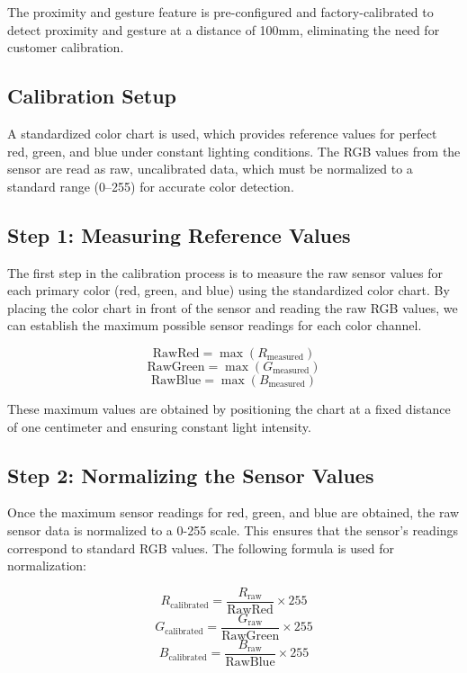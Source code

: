 \medskip

The proximity and gesture feature is pre-configured and factory-calibrated to detect proximity and gesture at a distance of 100mm, eliminating the need for customer calibration.
\cite{BroadcomAPDS9960:2024}

\subsection{Calibration Setup}

A standardized color chart is used, which provides reference values for perfect red, green, and blue under constant lighting conditions. The RGB values from the sensor are read as raw, uncalibrated data, which must be normalized to a standard range (0–255) for accurate color detection.

\subsection{Step 1: Measuring Reference Values}

The first step in the calibration process is to measure the raw sensor values for each primary color (red, green, and blue) using the standardized color chart. By placing the color chart in front of the sensor and reading the raw RGB values, we can establish the maximum possible sensor readings for each color channel.

\[
\text{RawRed} = \max(R_{\text{measured}})
\]
\[
\text{RawGreen} = \max(G_{\text{measured}})
\]
\[
\text{RawBlue} = \max(B_{\text{measured}})
\]

These maximum values are obtained by positioning the chart at a fixed distance of one centimeter and ensuring constant light intensity.

\subsection{Step 2: Normalizing the Sensor Values}
Once the maximum sensor readings for red, green, and blue are obtained, the raw sensor data is normalized to a 0-255 scale. This ensures that the sensor's readings correspond to standard RGB values. The following formula is used for normalization:

\[
R_{\text{calibrated}} = \frac{R_{\text{raw}}}{\text{RawRed}} \times 255
\]
\[
G_{\text{calibrated}} = \frac{G_{\text{raw}}}{\text{RawGreen}} \times 255
\]
\[
B_{\text{calibrated}} = \frac{B_{\text{raw}}}{\text{RawBlue}} \times 255
\]

